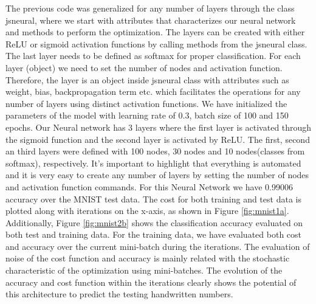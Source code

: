 \documentclass{article}
\begin{document}
The previous code was generalized for any number of layers through the class jsneural, where we start with attributes that characterizes our neural network and methods to perform the optimization. The layers can be created with either ReLU or sigmoid activation functions by calling methods from the jsneural class. The last layer needs to be defined as softmax for proper classification. For each layer (object) we need to set the number of nodes and activation function. Therefore, the layer is an object inside jsneural class with attributes such as weight, bias, backpropagation term etc. which facilitates the operations for any number of layers using distinct activation functions. We have initialized the parameters of the model with learning rate of 0.3, batch size of 100 and 150 epochs. Our Neural network has 3 layers where the first layer is activated through the sigmoid function and the second layer is activated by ReLU. The first, second an third layers were defined with 100 nodes, 30 nodes and 10 nodes(classes from softmax), respectively. It's important to highlight that everything is automated and it is very easy to create any number of layers by setting the number of nodes and activation function commands. For this Neural Network we have 0.99006 accuracy over the MNIST test data. The cost for both training and test data is plotted along with iterations on the x-axis, as shown in Figure \ref{fig:mnist1a}. Additionally, Figure \ref{fig:mnist2b}  shows the classification accuracy evaluated on both test and training data. For the training data, we have evaluated both cost and accuracy over the current mini-batch during the iterations. The evaluation of  noise of the cost function and accuracy is mainly related with the stochastic characteristic of the optimization using mini-batches. The evolution of the accuracy and cost function within the iterations clearly shows the potential of this architecture to predict the testing handwritten numbers.
\end{document}
